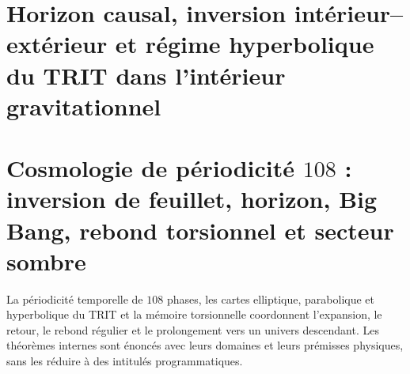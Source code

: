 \chapter{Horizon causal, inversion intérieur--extérieur et régime hyperbolique du TRIT dans l'intérieur gravitationnel}
\label{chap:md-horizonte-inversion-trit}



\chapter{Cosmologie de périodicité \texorpdfstring{\(108\)}{108} : inversion de feuillet, horizon, Big Bang, rebond torsionnel et secteur sombre}
\label{chap:md-cosmologia-periodicidad-108-definitiva}
La périodicité temporelle de \(108\) phases, les cartes elliptique, parabolique et
hyperbolique du TRIT et la mémoire torsionnelle coordonnent l'expansion, le retour,
le rebond régulier et le prolongement vers un univers descendant. Les
théorèmes internes sont énoncés avec leurs domaines et leurs prémisses physiques, sans
les réduire à des intitulés programmatiques.



\begingroup
\let\HMTOwnerSection\section
\let\HMTOwnerSubsection\subsection
\let\HMTOwnerSubsubsection\subsubsection
\let\HMTOwnerParagraph\paragraph
\let\chapter\HMTOwnerSection
\let\section\HMTOwnerSubsection
